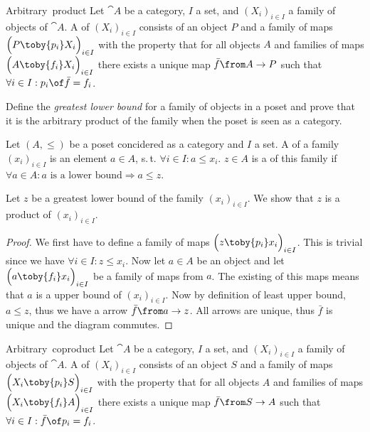 
\begin{definition}{Arbitrary\ product}
  Let $\cat{A}$ be a category, $I$ a set, and $(X_i)_{i \in I}$ a family of objects of $\cat{A}$.
  A  of $(X_i)_{i \in I}$ consists of an object $P$ and a family of maps
  $\Bigl(P \toby{p_i} X_i\Bigr)_{i \in I}$
  with the property that for all objects $A$ and families of maps
  $\Bigl(A \toby{f_i} X_i\Bigr)_{i \in I}$
  there exists a unique map $\bar{f}\from A \to P$ such that
  $\forall i \in I: p_i \of \bar{f} = f_i$.
\end{definition}

\begin{exercise}
  Define the \emph{greatest lower bound} for a family of objects in a poset and prove that it is the arbitrary product of the family when the poset is seen as a category.
\end{exercise}

\begin{answer}
  Let $(A, \le)$ be a poset concidered as a category and $I$ a set.
  A  of a family $(x_i)_{i\in I}$ is an element $a \in A$, s.\,t. $\forall i \in I: a \le x_i$.
  $z \in A$ is a  of this family if $\forall a \in A: \text{$a$ is a lower bound} \Rightarrow a \le z$.

  Let $z$ be a greatest lower bound of the family $(x_i)_{i\in I}$. We show that $z$ is a product of $(x_i)_{i\in I}$.
  \begin{proof}
    We first have to define a family of maps $\Bigl(z \toby{p_i} x_i\Bigr)_{i \in I}$.
    This is trivial since we have $\forall i \in I: z \le x_i$.
    Now let $a \in A$ be an object and let $\Bigl(a \toby{f_i} x_i\Bigr)_{i \in I}$ be a family of maps from $a$.
    The existing of this maps means that $a$ is a upper bound of $(x_i)_{i\in I}$.
    Now by definition of least upper bound, $a \le z$, thus we have a arrow $\bar{f} \from a \to z$.
    All arrows are unique, thus $\bar{f}$ is unique and the diagram commutes. \qedhere
  \end{proof}
\end{answer}

\begin{definition}{Arbitrary\ coproduct}
  Let $\cat{A}$ be a category, $I$ a set, and $(X_i)_{i \in I}$ a family of objects of $\cat{A}$.
  A  of $(X_i)_{i \in I}$ consists of an object $S$ and a family of maps
  $\Bigl(X_i \toby{p_i} S\Bigr)_{i \in I}$
  with the property that for all objects $A$ and families of maps
  $\Bigl(X_i \toby{f_i} A\Bigr)_{i \in I}$
  there exists a unique map $\bar{f}\from S \to A$ such that
  $\forall i \in I: \bar{f} \of p_i = f_i$.
\end{definition}

